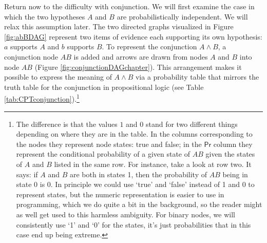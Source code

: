 \documentclass[
  10pt,
  dvipsnames,enabledeprecatedfontcommands]{scrartcl}
\begin{document}
Return now to the difficulty with conjunction. We will first examine the
case in which the two hypotheses \(A\) and \(B\) are probabilistically
independent. We will relax this assumption later. The two directed
graphs visualized in Figure \ref{fig:abBDAG} represent two items of
evidence each supporting its own hypothesis: \(a\) supports \(A\) and
\(b\) supports \(B\). To represent the conjunction \(A\wedge B\), a
conjunction node \(AB\) is added and arrows are drawn from nodes \(A\)
and \(B\) into node \(AB\) (Figure \ref{fig:conjunctionDAGchapter}).
This arrangement makes it possible to express the meaning of
\(A\wedge B\) via a probability table that mirrors the truth table for
the conjunction in propositional logic (see Table
\ref{tab:CPTconjunction}).\footnote{The difference is that the values
  \(1\) and \(0\) stand for two different things depending on where they
  are in the table. In the columns corresponding to the nodes they
  represent node states: true and false; in the \(\textsf{Pr}\) column
  they represent the conditional probability of a given state of \(AB\)
  given the states of \(A\) and \(B\) listed in the same row. For
  instance, take a look at row two. It says: if \(A\) and \(B\) are both
  in states 1, then the probability of \(AB\) being in state 0 is 0. In
  principle we could use `true' and `false' instead of 1 and 0 to
  represent states, but the numeric representation is easier to use in
  programming, which we do quite a bit in the background, so the reader
  might as well get used to this harmless ambiguity. For binary nodes,
  we will consistently use `1' and `0' for the states, it's just
  probabilities that in this case end up being extreme.}
\end{document}

